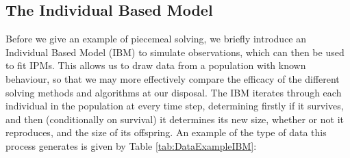 \documentclass[a4paper,12pt]{article}
\begin{document}
\subsection{The Individual Based Model}
 Before we give an example of piecemeal solving, we briefly introduce an Individual Based Model (IBM) to simulate observations, which can then be used to fit IPMs. This allows us to draw data from a population with known behaviour, so that we may more effectively compare the efficacy of the different solving methods and algorithms at our disposal. The IBM iterates through each individual in the population at every time step, determining firstly if it survives, and then (conditionally on survival) it determines its new size, whether or not it reproduces, and the size of its offspring. An example of the type of data this process generates is given by Table \ref{tab:DataExampleIBM}:\\
\end{document}
